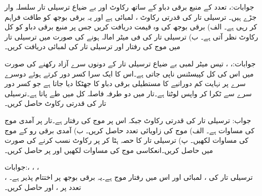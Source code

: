 جوابات:، 
تعدد  کے منبع برقی دباو کے ساتھ رکاوٹ  اور بے ضیاع ترسیلی تار سلسلہ وار جڑے ہیں۔ ترسیلی تار کی قدرتی رکاوٹ ، لمبائی  ہے اور یہ برقی بوجھ  کو طاقت فراہم کر رہی ہے۔ الف) برقی بوجھ کی وہ قیمت دریافت کریں جس پر منبع برقی دباو کو کل  رکاوٹ نظر آتی ہے۔ ب) ترسیلی تار کی فی میٹر امالہ  ہونے کی صورت میں ترسیلی تار میں موج کی رفتار اور ترسیلی تار کی لمبائی دریافت کریں۔ 

جوابات:، ، 
تیس میٹر لمبی بے ضیاع ترسیلی تار کے دونوں سرے آزاد رکھنے کی صورت میں اس کی کل کپیسٹنس  ناپی جاتی ہے۔اس کا ایک سرا کسر دور کرتے ہوئے دوسرے سرے پر نہایت کم دورانیے کا مستطیلی برقی دباو کا جھٹکا دیا جاتا ہے جو کسر دور سرے سے ٹکرا کر واپس لوٹتا ہے۔تار میں دو طرفہ فاصلہ کل  میں طے پاتا ہے۔ترسیلی تار کی قدرتی رکاوٹ حاصل کریں۔

جواب:  
ترسیلی تار کی قدرتی رکاوٹ  جبکہ اس پر موج کی رفتار  ہے۔تار پر آمدی موج کی مساوات   ہے۔ الف) موج کی زاویائی تعدد حاصل کریں۔ ب) آمدی برقی رو کے موج کی مساوات لکھیں۔ پ) ترسیلی تار کا  حصہ ہٹا کر  پر  رکاوٹ نسب کرنے کی صورت میں  حاصل کریں۔انعکاسی موج  کی مساوات لکھیں اور  پر  حاصل کریں۔

جوابات:، ،
 ، \\
، 
ترسیلی تار کی ، لمبائی  اور اس میں رفتار موج  ہے۔یہ  برقی بوجھ پر اختتام پذیر ہے۔تعدد  پر  ،  اور  حاصل کریں۔


